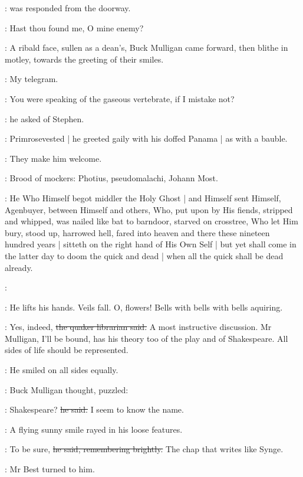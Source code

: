 :
was responded from the doorway.

\StephenInt:
Hast thou found me,
O mine enemy?


:
A ribald face,
sullen as a dean's,
Buck Mulligan came forward,
then blithe in motley,
towards the greeting of their smiles.

\StephenInt:
My telegram.

\mulligan:
You were speaking of the gaseous vertebrate,
if I mistake not?

:
he asked of Stephen.

:
Primrosevested |
he greeted gaily with his doffed Panama |
as with a bauble.%

\StephenInt:
They make him welcome.

\StephenInt:
Brood of mockers:
Photius,
pseudomalachi,
Johann Most.

\StephenInt:
He Who Himself begot middler the Holy Ghost |
and Himself sent Himself,
Agenbuyer,
between Himself and others,
Who,
put upon by His fiends,
stripped and whipped,
was nailed like bat to barndoor,
starved on crosstree,
Who let Him bury,
stood up,
harrowed hell,
fared into heaven and there these nineteen hundred years |
sitteth on the right hand of His Own Self |
but yet shall come in the latter day to doom the quick and dead |
when all the quick shall be dead already.

\StephenInt:

\StephenInt:
He lifts his hands.
Veils fall.
O, flowers!
Bells with bells with bells aquiring.

\librarian:
Yes, indeed,
\sout{the quaker librarian said.}
A most instructive discussion.
Mr Mulligan,
I'll be bound,
has his theory too of the play and of Shakespeare.
All sides of life should be represented.

:
He smiled on all sides equally.

:
Buck Mulligan thought,
puzzled:

\mulligan:
Shakespeare?
\sout{he said.}
I seem to know the name.

:
A flying sunny smile rayed in his loose features.

\mulligan:
To be sure,
\sout{he said, remembering brightly.}
The chap that writes like Synge.

:
Mr Best turned to him.

